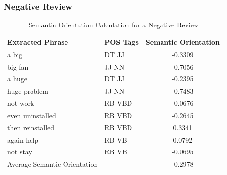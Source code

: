 \documentclass[11pt]{report} %
\begin{document}
\subsubsection{Negative Review}

\begin{table}[h]
	\centering
    \begin{tabular}{  l  l  c }
    \hline\hline
    	 Extracted Phrase & POS Tags & Semantic Orientation \\ \hline
	 a big & DT JJ & -0.3309 \\ \hline
	big fan & JJ NN & -0.7056 \\ \hline
	a huge & DT JJ & -0.2395 \\ \hline \hline
	huge problem & JJ NN & -0.7483 \\ \hline \hline
	not work &  RB VBD & -0.0676 \\ \hline \hline
	even uninstalled & RB VBD  & -0.2645 \\ \hline \hline
	then reinstalled &  RB VBD & 0.3341 \\ \hline \hline
	again help &  RB VB  & 0.0792 \\ \hline \hline
	not stay & RB VB & -0.0695\\ \hline \hline
	Average Semantic Orientation & & -0.2978 \\ \hline
    \hline
    \end{tabular}
\caption{Semantic Orientation Calculation for a Negative Review}
\label{fig:negative_review}
\end{table}
\end{document}
